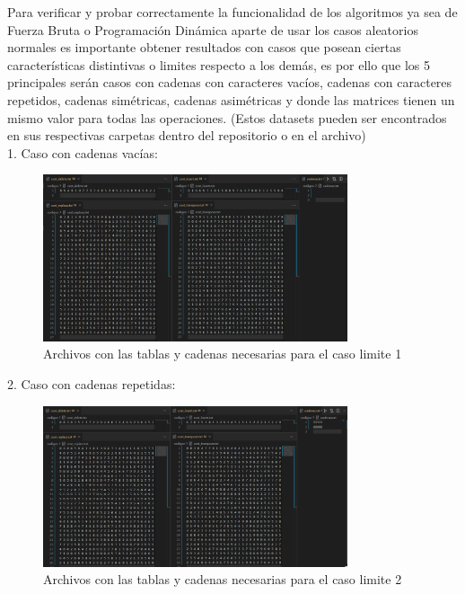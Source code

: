 Para verificar y probar correctamente la funcionalidad de los algoritmos ya sea de Fuerza Bruta o Programación Dinámica aparte de usar los casos aleatorios normales es importante obtener resultados con casos que posean ciertas características distintivas o limites respecto a los demás, es por ello que los 5 principales serán casos con cadenas con caracteres vacíos, cadenas con caracteres repetidos, cadenas simétricas, cadenas asimétricas y donde las matrices tienen un mismo valor para todas las operaciones. (Estos datasets pueden ser encontrados en sus respectivas carpetas dentro del repositorio o en el archivo)\\

1. Caso con cadenas vacías: \\
\begin{figure}[ht]
  \centering
  \includegraphics[width=0.8\textwidth]{./images/Casos1.png}
  \caption{Archivos con las tablas y cadenas necesarias para el caso limite 1}
  \label{fig:imagen}
\end{figure}

2. Caso con cadenas repetidas:\\
\begin{figure}[ht]
  \centering
  \includegraphics[width=0.8\textwidth]{./images/Casos2.png}
  \caption{Archivos con las tablas y cadenas necesarias para el caso limite 2}
  \label{fig:imagen}
\end{figure}

